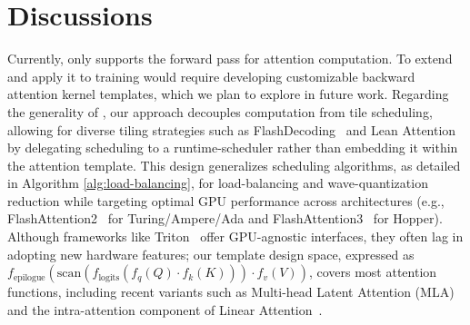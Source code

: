 \section{Discussions}
\label{sec:discussions}

Currently, \sys only supports the forward pass for attention computation.
To extend \sys and apply it to training would require developing customizable backward attention kernel templates, which we plan to explore in future work.
Regarding the generality of \sys, our approach decouples computation from tile scheduling, allowing for diverse tiling strategies such as FlashDecoding~\cite{flashdecodingpp} and Lean Attention~\cite{sanovar2024lean} by delegating scheduling to a runtime-scheduler rather than embedding it within the attention template.
This design generalizes scheduling algorithms, as detailed in Algorithm \ref{alg:load-balancing}, for load-balancing and wave-quantization reduction while targeting optimal GPU performance across architectures (e.g., FlashAttention2~\cite{dao2023flashattention2} for Turing/Ampere/Ada and FlashAttention3~\cite{jay2024flashattention3} for Hopper).
Although frameworks like Triton~\cite{triton} offer GPU-agnostic interfaces, they often lag in adopting new hardware features; our template design space, expressed as $f_\textrm{epilogue}(\textrm{scan}(f_\textrm{logits}(f_{q}(Q)\cdot f_{k}(K)))\cdot f_{v}(V))$, covers most attention functions, including recent variants such as Multi-head Latent Attention (MLA)~\cite{deepseekv2} and the intra-attention component of Linear Attention~\cite{yang2024gatedlinearattentiontransformers}.
